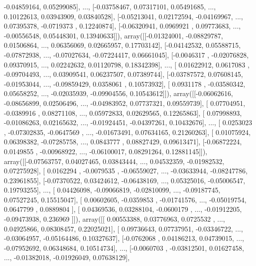 \documentclass{article}
\begin{document}
        -0.04859164,  0.05299085],
       ..., 
       [-0.03758467,  0.07317101,  0.05491685, ...,  0.10122613,
         0.03943909,  0.03840528],
       [-0.05213041,  0.02172594, -0.04169967, ...,  0.07395378,
        -0.0719373 ,  0.12240874],
       [-0.06320941,  0.0969921 ,  0.09773683, ..., -0.00556548,
         0.05448301,  0.13940633]]), array([[-0.01324001, -0.08829787,  0.01506864, ...,  0.06356069,
         0.02665957,  0.17703142],
       [-0.04142532,  0.05588715, -0.07872938, ..., -0.07027634,
        -0.07224417,  0.06661045],
       [-0.0046317 , -0.02076828,  0.09370915, ...,  0.02242632,
         0.01120798,  0.18342398],
       ..., 
       [ 0.01622912,  0.0617083 , -0.09704493, ...,  0.03909541,
         0.06237507,  0.07389744],
       [-0.03787572,  0.07608145, -0.01953044, ..., -0.09859429,
         0.0358061 ,  0.10573932],
       [ 0.0931178 , -0.03580342,  0.05658252, ..., -0.02035939,
        -0.09904556,  0.10543612]]), array([[-0.06062616, -0.08656899,  0.02506496, ..., -0.04983952,
         0.07737321,  0.09559739],
       [ 0.07704951, -0.0389916 ,  0.08271108, ...,  0.05972833,
         0.02629565,  0.12265863],
       [ 0.07998893, -0.01086263,  0.02165632, ..., -0.01924451,
        -0.04397261,  0.10432676],
       ..., 
       [ 0.0253023 , -0.07302835, -0.0647569 , ..., -0.01673491,
         0.07634165,  0.21260263],
       [ 0.01075924,  0.06398382, -0.07285758, ...,  0.0843777 ,
         0.08827429,  0.09613471],
       [-0.06872224,  0.0149855 , -0.00968922, ..., -0.06100017,
         0.08291264,  0.12881145]]), array([[-0.07563757,  0.04027465,  0.03843444, ...,  0.04532359,
        -0.01982532,  0.07275928],
       [ 0.0162294 , -0.0079535 , -0.06559027, ..., -0.03633944,
        -0.08247786,  0.23961855],
       [-0.07370522,  0.03424612, -0.06438169, ...,  0.05325016,
        -0.05006547,  0.19793255],
       ..., 
       [ 0.04426098, -0.09066819, -0.02810099, ..., -0.09187745,
         0.07527245,  0.15515047],
       [ 0.00602605, -0.0359853 , -0.01741576, ..., -0.05019754,
         0.0647799 ,  0.0889804 ],
       [ 0.04369536,  0.03288104, -0.0600179 , ..., -0.01912205,
        -0.09473938,  0.236969  ]]), array([[ 0.00553388,  0.03776963,  0.0725532 , ...,  0.04925866,
         0.08308457,  0.22025021],
       [ 0.09736643,  0.07737951, -0.03346722, ..., -0.03064957,
        -0.05164486,  0.10327637],
       [-0.0762068 ,  0.04186213,  0.04739015, ..., -0.07952692,
         0.06348684,  0.10514734],
       ..., 
       [-0.0060703 , -0.03812501,  0.01627458, ..., -0.01382018,
        -0.01926049,  0.07638129],
\end{document}
